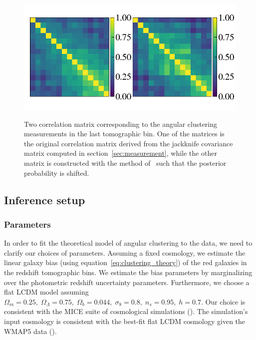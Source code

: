 \documentclass[fleqn,usenatbib,useAMS]{mnras}
\begin{document}
\begin{figure}
\includegraphics[width=\textwidth]{figures_tmp/correlation_last_bin_cosmo.png}
\label{fig:blind}
\caption{\label{fig:covariance_estimate} Two correlation matrix corresponding to the angular clustering measurements in the last tomographic bin. One of the matrices is the original correlation matrix derived from the jackknife covariance matrix computed in section~\ref{sec:measurement}, while the other matrix is constructed with the method of~\citet{sellentin2019} such that the posterior probability is shifted.} 
\end{figure}

\subsection{Inference setup}\label{sec:inference}

\subsubsection{Parameters}

In order to fit the theoretical model of angular clustering to the data, we need to clarify our choices of parameters. Assuming a fixed cosmology, we estimate the linear galaxy bias (using equation~\ref{eq:clustering_theory}) of the red galaxies in the redshift tomographic bins. We estimate the bias parameters by marginalizing over the photometric redshift uncertainty parameters.  
Furthermore, we choose a flat LCDM model assuming $\Omega_m = 0.25, \;\Omega_{\Lambda} = 0.75, \; \Omega_b = 0.044, \; \sigma_{8} = 0.8, \; n_s = 0.95, \; h = 0.7$. Our choice is consistent with the MICE suite of cosmological simulations (\citealt{MICE1}). The simulation's input cosmology is consistent with the best-fit flat LCDM cosmology given the WMAP5 data (\citealt{WMAP5}). 
\end{document}
